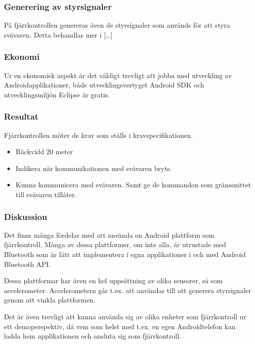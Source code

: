 \subsubsection{Generering av styrsignaler}
På fjärrkontrollen genereras även de styrsignaler som används för att styra svävaren. Detta behandlas mer i […]

\subsubsection{Ekonomi}
Ur en ekonomisk aspekt är det väldigt trevligt att jobba med utveckling av Androidapplikationer, både utvecklingsvertyget Android SDK och utvecklingsmiljön Eclipse är gratis.

\subsubsection{Resultat}
Fjärrkontrollen möter de krav som ställs i kravspecifikationen.

\begin {itemize}
\item Räckvidd 20 meter
\item Indikera när kommunikationen med svävaren bryts.
\item Kunna kommunicera med svävaren. Samt ge de kommandon som gränssnittet till svävaren tillåter.
\end {itemize}

\subsubsection{Diskussion}
Det finns många fördelar med att använda en Android plattform som fjärrkontroll. Många av dessa plattformer, om inte alla, är utrustade med Bluetooth som är lätt att implementera i egna applikationer i och med Android Bluetooth API. 

Dessa plattformar har även en hel uppsättning av olika sensorer, så som accelerometer. Accelerometern går t.ex. att användas till att generera styrsignaler genom att vinkla plattformen.

Det är även trevligt att kunna använda sig av olika enheter som fjärrkontroll ur ett demoperspektiv, då vem som helst med t.ex. en egen Androidtelefon kan ladda hem applikationen och ansluta sig som fjärrkontroll. 






